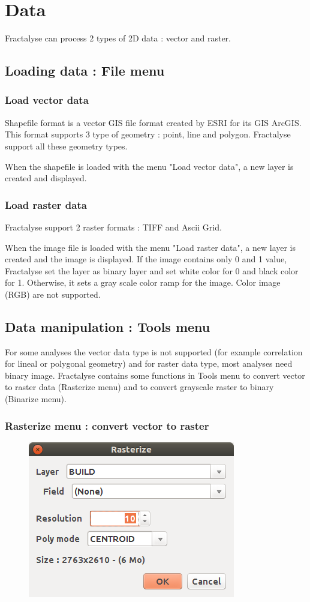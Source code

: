 \documentclass[a4paper,10pt]{report}
\begin{document}
\chapter{Data}
Fractalyse can process 2 types of 2D data : vector and raster.
\section{Loading data : File menu}
\subsection{Load vector data}
Shapefile format is a vector GIS file format created by ESRI for its GIS ArcGIS.
This format supports 3 type of geometry : point, line and polygon.
Fractalyse support all these geometry types. 

When the shapefile is loaded with the menu "Load vector data", a new layer is created and displayed.

\subsection{Load raster data}
Fractalyse support 2 raster formats : TIFF and Ascii Grid.

When the image file is loaded with the menu "Load raster data", a new layer is created and the image is displayed. If the image contains only 0 and 1 value, Fractalyse set the layer as binary layer and set white color for 0 and black color for 1. Otherwise, it sets a gray scale color ramp for the image. Color image (RGB) are not supported.


\section{Data manipulation : Tools menu}
For some analyses the vector data type is not supported (for example correlation for lineal or polygonal geometry) and for raster data type, most analyses need binary image. Fractalyse contains some functions in Tools menu to convert vector to raster data (Rasterize menu) and to convert grayscale raster to binary (Binarize menu).

\subsection{Rasterize menu : convert vector to raster}
\begin{figure}[H]
	\includegraphics[scale=0.5]{img/rasterize-en.png}
\end{figure}
\end{document}
